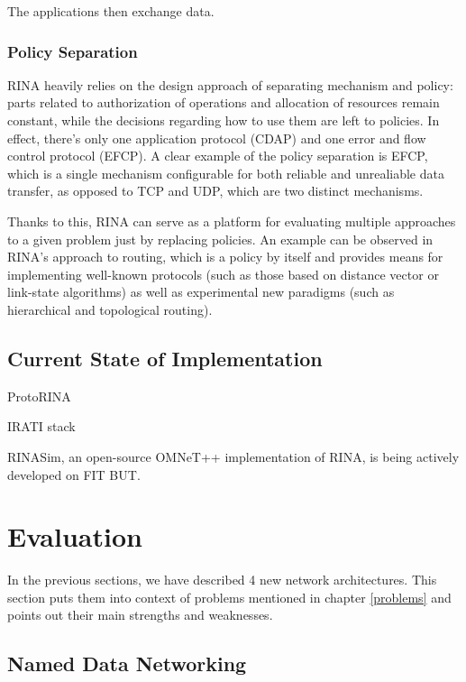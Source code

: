                 The applications then exchange data.


            \subsubsection{Policy Separation}

                RINA heavily relies on the design approach of separating mechanism and policy: parts related to authorization of operations and allocation of resources remain constant, while the decisions regarding how to use them are left to policies. In effect, there's only one application protocol (CDAP) and one error and flow control protocol (EFCP). A clear example of the policy separation is EFCP, which is a single mechanism configurable for both reliable and unrealiable data transfer, as opposed to TCP and UDP, which are two distinct mechanisms.

                Thanks to this, RINA can serve as a platform for evaluating multiple approaches to a given problem just by replacing policies. An example can be observed in RINA's approach to routing, which is a policy by itself and provides means for implementing well-known protocols (such as those based on distance vector or link-state algorithms) as well as experimental new paradigms (such as hierarchical and topological routing).

        \subsection{Current State of Implementation}

            ProtoRINA

            IRATI stack

            RINASim, an open-source OMNeT++ implementation of RINA, is being actively developed on FIT BUT.

    \section{Evaluation}

        In the previous sections, we have described 4 new network architectures. This section puts them into context of problems mentioned in chapter \ref{problems} and points out their main strengths and weaknesses.

        \subsection{Named Data Networking}

